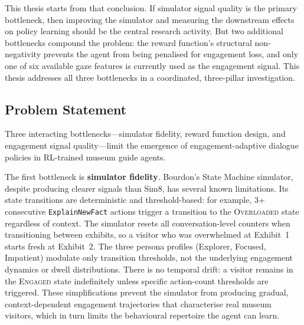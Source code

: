 \documentclass[a4paper, 11pt]{article}
\begin{document}
This thesis starts from that conclusion. If simulator signal quality is the primary bottleneck, then improving the simulator and measuring the downstream effects on policy learning should be the central research activity. But two additional bottlenecks compound the problem: the reward function's structural non-negativity prevents the agent from being penalised for engagement loss, and only one of six available gaze features is currently used as the engagement signal. This thesis addresses all three bottlenecks in a coordinated, three-pillar investigation.

\subsection{Problem Statement}
\label{sec:problem_statement}

Three interacting bottlenecks---simulator fidelity, reward function design, and engagement signal quality---limit the emergence of engagement-adaptive dialogue policies in RL-trained museum guide agents.

The first bottleneck is \textbf{simulator fidelity}. Bourdon's State Machine simulator, despite producing clearer signals than Sim8, has several known limitations. Its state transitions are deterministic and threshold-based: for example, 3+ consecutive \texttt{ExplainNewFact} actions trigger a transition to the \textsc{Overloaded} state regardless of context. The simulator resets all conversation-level counters when transitioning between exhibits, so a visitor who was overwhelmed at Exhibit~1 starts fresh at Exhibit~2. The three persona profiles (Explorer, Focused, Impatient) modulate only transition thresholds, not the underlying engagement dynamics or dwell distributions. There is no temporal drift: a visitor remains in the \textsc{Engaged} state indefinitely unless specific action-count thresholds are triggered. These simplifications prevent the simulator from producing gradual, context-dependent engagement trajectories that characterise real museum visitors, which in turn limits the behavioural repertoire the agent can learn.
\end{document}

